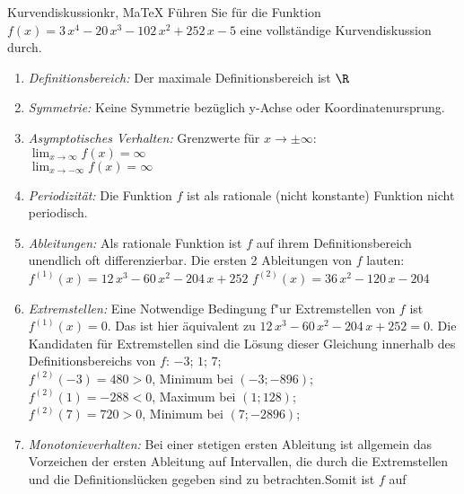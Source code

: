  \providecommand{\MoIl}{(} 
 \providecommand{\MoIr}{)}
 \providecommand{\MIntvlSep}{;} 
 \providecommand{\MElSetSep}{;} 
 \begin{MAufgabe}{Kurvendiskussion}{kr, MaTeX}
 F\"uhren Sie f\"ur die Funktion $f(x)=3\, x^4 - 20\, x^3 - 102\, x^2 + 252\, x - 5$ eine vollst\"andige Kurvendiskussion durch.\\ 
 \ifLsg\Loesung
 \begin{enumerate}
 \item \emph{Definitionsbereich:} 
 Der maximale Definitionsbereich ist $\R$\item \emph{Symmetrie:} 
 Keine Symmetrie bez\"uglich y-Achse oder Koordinatenursprung.\item \emph{Asymptotisches Verhalten:} 
 Grenzwerte f\"ur $x\rightarrow \pm \infty$: \\ 
 $\lim_{x\rightarrow \infty} f(x)=\infty$ \\ 
 $\lim_{x\rightarrow -\infty} f(x)=\infty$ \\ 
 \item \emph{Periodizit\"at:} 
 Die Funktion $f$ ist als rationale (nicht konstante) Funktion nicht periodisch.\item \emph{Ableitungen:} 
 Als rationale Funktion ist $f$ auf ihrem Definitionsbereich unendlich oft differenzierbar. 
 Die ersten 2 Ableitungen von $f$ lauten: \\ 
 $f^{(1)}(x)=12\, x^3 - 60\, x^2 - 204\, x + 252$\newline 
  $f^{(2)}(x)=36\, x^2 - 120\, x - 204$\newline 
  \item \emph{Extremstellen:} 
 Eine Notwendige Bedingung f"ur Extremstellen von $f$ ist $f^{(1)}(x)=0$. 
 Das ist hier \"aquivalent zu $12\, x^3 - 60\, x^2 - 204\, x + 252=0$. 
 Die Kandidaten f\"ur Extremstellen sind die L\"osung dieser Gleichung innerhalb des Definitionsbereichs von $f$: $-3$; $1$; $7$; \\ 
 $f^{(2)}(-3)=480$$>0$, Minimum bei $(-3;-896)$; \\ 
 $f^{(2)}(1)=-288$$<0$, Maximum bei $(1;128)$; \\ 
 $f^{(2)}(7)=720$$>0$, Minimum bei $(7;-2896)$; \\ 
 \item \emph{Monotonieverhalten:} 
 Bei einer stetigen ersten Ableitung ist allgemein das Vorzeichen der ersten Ableitung auf Intervallen, die durch die Extremstellen und die Definitionsl\"ucken gegeben sind zu betrachten.Somit ist $f$ auf \\ 
$$
\end{enumerate}
\end{MAufgabe}
